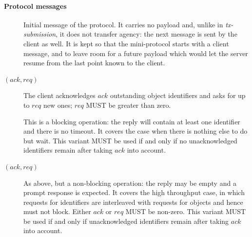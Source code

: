 \paragraph{Protocol messages}
\begin{description}
\item [\MsgInit]
  Initial message of the protocol.  It carries no payload and, unlike in
  \textit{tx-submission}, it does not transfer agency: the next message is sent
  by the client as well.  It is kept so that the mini-protocol starts with
  a client message, and to leave room for a future payload which would let the
  server resume from the last point known to the client.
\item [\MsgRequestObjIdsB{} {\boldmath $(ack,req)$}]
  The client acknowledges $ack$ outstanding object identifiers and asks for up
  to $req$ new ones; $req$ MUST be greater than zero.

  This is a blocking operation: the reply will contain at least one identifier
  and there is no timeout.  It covers the case when there is nothing else to do
  but wait.  This variant MUST be used if and only if no unacknowledged
  identifiers remain after taking $ack$ into account.
\item [\MsgRequestObjIdsNB{} {\boldmath $(ack,req)$}]
  As above, but a non-blocking operation: the reply may be empty and a prompt
  response is expected.  It covers the high throughput case, in which requests
  for identifiers are interleaved with requests for objects and hence must not
  block.  Either $ack$ or $req$ MUST be non-zero.  This variant MUST be used if
  and only if unacknowledged identifiers remain after taking $ack$ into
  account.


\end{description}
